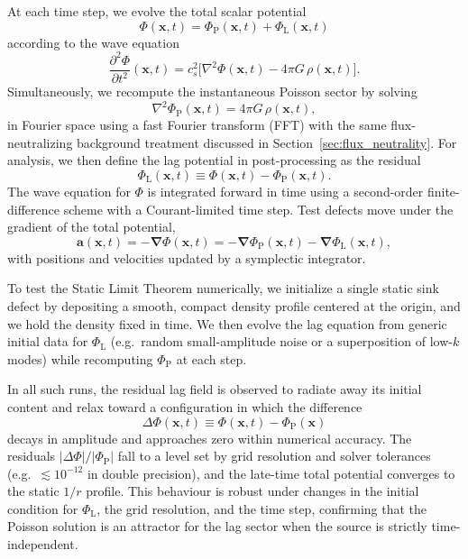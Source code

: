 \documentclass[11pt]{article}
\newcommand{\cS}{c_s}
\newcommand{\PhiP}{\Phi_{\mathrm{P}}}
\newcommand{\PhiL}{\Phi_{\mathrm{L}}}
\begin{document}
At each time step, we evolve the total scalar potential
\begin{equation}
  \Phi(\mathbf{x},t) = \PhiP(\mathbf{x},t) + \PhiL(\mathbf{x},t)
\end{equation}
according to the wave equation
\begin{equation}
  \frac{\partial^2 \Phi}{\partial t^2}(\mathbf{x},t)
  = \cS^2 \bigl[\nabla^2 \Phi(\mathbf{x},t) - 4\pi G\,\rho(\mathbf{x},t)\bigr].
\end{equation}
Simultaneously, we recompute the instantaneous Poisson sector by solving
\begin{equation}
  \nabla^2 \PhiP(\mathbf{x},t)
  = 4\pi G\,\rho(\mathbf{x},t),
\end{equation}
in Fourier space using a fast Fourier transform (FFT) with the same
flux-neutralizing background treatment discussed in
Section~\ref{sec:flux_neutrality}. For analysis, we then define the lag
potential in post-processing as the residual
\begin{equation}
  \PhiL(\mathbf{x},t) \equiv \Phi(\mathbf{x},t) - \PhiP(\mathbf{x},t).
\end{equation}
The wave equation for $\Phi$ is integrated forward in time using a
second-order finite-difference scheme with a Courant-limited time step.
Test defects move under the gradient of the total potential,
\begin{equation}
  \mathbf{a}(\mathbf{x},t) = -\bm{\nabla}\Phi(\mathbf{x},t)
  = -\bm{\nabla}\PhiP(\mathbf{x},t) - \bm{\nabla}\PhiL(\mathbf{x},t),
\end{equation}
with positions and velocities updated by a symplectic integrator.

To test the Static Limit Theorem numerically, we initialize a single static sink defect by depositing a smooth, compact density profile centered at the origin, and we hold the density fixed in time. We then evolve the lag equation from generic initial data for $\PhiL$ (e.g.\ random small-amplitude noise or a superposition of low-$k$ modes) while recomputing $\PhiP$ at each step.

In all such runs, the residual lag field is observed to radiate away its initial content and relax toward a configuration in which the difference
\begin{equation}
  \Delta \Phi(\mathbf{x},t)
  \equiv \Phi(\mathbf{x},t) - \PhiP(\mathbf{x})
\end{equation}
decays in amplitude and approaches zero within numerical accuracy. The residuals $|\Delta\Phi|/|\PhiP|$ fall to a level set by grid resolution and solver tolerances (e.g.\ $\lesssim 10^{-12}$ in double precision), and the late-time total potential converges to the static $1/r$ profile. This behaviour is robust under changes in the initial condition for $\PhiL$, the grid resolution, and the time step, confirming that the Poisson solution is an attractor for the lag sector when the source is strictly time-independent.
\end{document}
